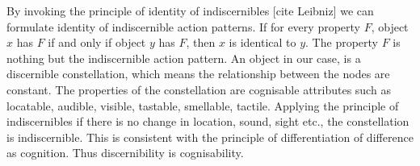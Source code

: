 By invoking the principle of identity of indiscernibles [cite Leibniz] we can formulate identity of indiscernible action patterns. If for every property $F$, object $x$ has $F$ if and only if object $y$ has $F$, then $x$ is identical to $y$. The property $F$ is nothing but the indiscernible action pattern. An object in our case, is a discernible constellation, which means the relationship between the nodes are constant. The properties of the constellation are cognisable attributes such as locatable, audible, visible, tastable, smellable, tactile. Applying the principle of indiscernibles if there is no change in location, sound, sight etc., the constellation is indiscernible. This is consistent with the principle of differentiation of difference as cognition. Thus discernibility is cognisability.

